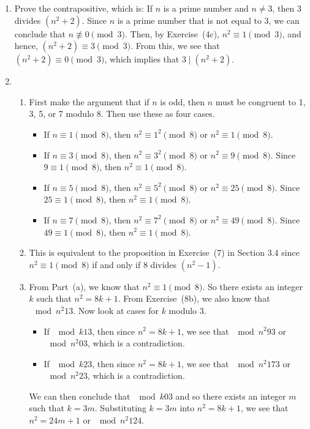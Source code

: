 \begin{enumerate}
\item Prove the contrapositive, which is:  If $n$ is a prime number and $n \ne 3$, then 
$3$ divides $\left( n^2 + 2 \right)$.  Since $n$ is a prime number that is not equal to 3, we can conclude that $n \not\equiv 0 \pmod 3$.  Then, by Exercise~(4c), $n^2 \equiv 1 \pmod 3$, and hence, $\left( n^2 + 2 \right) \equiv 3 \pmod 3$.  From this, we see that 
$\left( n^2 + 2 \right) \equiv 0 \pmod 3$, which implies that $3 \mid \left( n^2 + 2 \right)$.



\item \begin{enumerate}
\item First make the argument that if $n$ is odd, then $n$  must be congruent to 1, 3, 5, or 7 modulo 8.  Then use these as four cases.
\begin{itemize}
\item If $n \equiv 1 \pmod 8$, then $n^2 \equiv 1^2 \pmod 8$ or $n^2 \equiv 1 \pmod 8$.

\item If $n \equiv 3 \pmod 8$, then $n^2 \equiv 3^2 \pmod 8$ or $n^2 \equiv 9 \pmod 8$.  
Since $9 \equiv 1 \pmod 8$, then $n^2 \equiv 1 \pmod 8$.

\item If $n \equiv 5 \pmod 8$, then $n^2 \equiv 5^2 \pmod 8$ or $n^2 \equiv 25 \pmod 8$.  
Since $25 \equiv 1 \pmod 8$, then $n^2 \equiv 1 \pmod 8$.

\item If $n \equiv 7 \pmod 8$, then $n^2 \equiv 7^2 \pmod 8$ or $n^2 \equiv 49 \pmod 8$.  
Since $49 \equiv 1 \pmod 8$, then $n^2 \equiv 1 \pmod 8$.
\end{itemize}

\item This is equivalent to the proposition in Exercise~(7) in Section 3.4 since 
$n^2 \equiv 1 \pmod 8$ if and only if 8 divides $(n^2 - 1)$.

\item From Part~(a), we know that $n^2 \equiv 1 \pmod 8$.  So there exists an integer $k$ such that $n^2 = 8k + 1$.  From Exercise~(8b), we also know that $\mod{n^2}{1}{3}$.  Now look at cases for $k$ modulo 3.

\begin{itemize}
  \item If $\mod{k}{1}{3}$, then since $n^2 = 8k + 1$, we see that $\mod{n^2}{9}{3}$ or $\mod{n^2}{0}{3}$, which is a contradiction.
  \item If $\mod{k}{2}{3}$, then since $n^2 = 8k + 1$, we see that $\mod{n^2}{17}{3}$ or $\mod{n^2}{2}{3}$, which is a contradiction.
\end{itemize}
We can then conclude that $\mod{k}{0}{3}$ and so there exists an integer $m$ such that $k = 3m$.  Substituting $k = 3m$ into $n^2 = 8k + 1$, we see that $n^2 = 24m + 1$ or $\mod{n^2}{1}{24}$.
\end{enumerate}



\end{enumerate}

